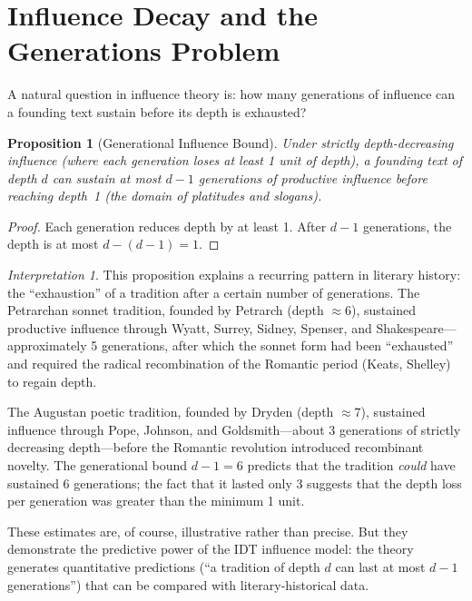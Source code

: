 \documentclass[11pt,openany]{book}
\theoremstyle{definition}
\theoremstyle{plain}
\newtheorem{proposition}[axiom]{Proposition}
\theoremstyle{remark}
\newtheorem{interpretation}[axiom]{Interpretation}
\begin{document}
\section{Influence Decay and the Generations Problem}

A natural question in influence theory is: how many generations of influence can a founding text sustain before its depth is exhausted?

\begin{proposition}[Generational Influence Bound]
Under strictly depth-decreasing influence (where each generation loses at least 1 unit of depth), a founding text of depth $d$ can sustain at most $d - 1$ generations of productive influence before reaching depth~1 (the domain of platitudes and slogans).
\end{proposition}

\begin{proof}
Each generation reduces depth by at least 1. After $d - 1$ generations, the depth is at most $d - (d-1) = 1$.
\end{proof}

\begin{interpretation}
This proposition explains a recurring pattern in literary history: the ``exhaustion'' of a tradition after a certain number of generations. The Petrarchan sonnet tradition, founded by Petrarch (depth $\approx 6$), sustained productive influence through Wyatt, Surrey, Sidney, Spenser, and Shakespeare---approximately 5 generations, after which the sonnet form had been ``exhausted'' and required the radical recombination of the Romantic period (Keats, Shelley) to regain depth.

The Augustan poetic tradition, founded by Dryden (depth $\approx 7$), sustained influence through Pope, Johnson, and Goldsmith---about 3 generations of strictly decreasing depth---before the Romantic revolution introduced recombinant novelty. The generational bound $d - 1 = 6$ predicts that the tradition \emph{could} have sustained 6 generations; the fact that it lasted only 3 suggests that the depth loss per generation was greater than the minimum 1 unit.

These estimates are, of course, illustrative rather than precise. But they demonstrate the predictive power of the IDT influence model: the theory generates quantitative predictions (``a tradition of depth $d$ can last at most $d - 1$ generations'') that can be compared with literary-historical data.
\end{interpretation}
\end{document}

